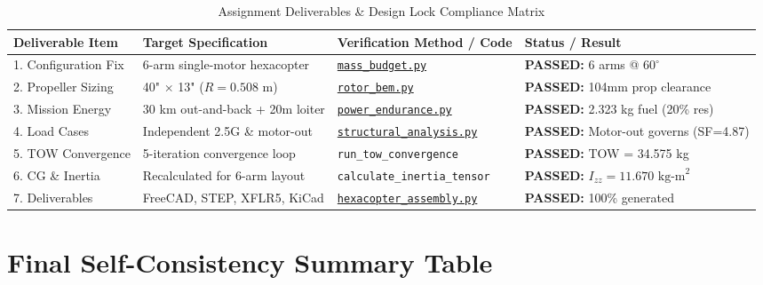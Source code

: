 \documentclass[11pt,a4paper]{article}
\begin{document}
\begin{table}[H]
    \centering
    \caption{Assignment Deliverables \& Design Lock Compliance Matrix}
    \begin{tabular}{p{3.5cm}p{4cm}p{4.5cm}l}
        \toprule
        \textbf{Deliverable Item} & \textbf{Target Specification} & \textbf{Verification Method / Code} & \textbf{Status / Result} \\
        \midrule
        1. Configuration Fix & 6-arm single-motor hexacopter & \href{https://github.com/Bishu-crypto/quadcopter-autonomy/blob/main/projects/heavy-lift-uav/design_calculations/mass_budget.py}{\texttt{mass\_budget.py}} & \textbf{PASSED:} 6 arms @ $60^\circ$ \\
        2. Propeller Sizing & 40" $\times$ 13" ($R = 0.508\text{ m}$) & \href{https://github.com/Bishu-crypto/quadcopter-autonomy/blob/main/projects/heavy-lift-uav/simulation/rotor_bem.py}{\texttt{rotor\_bem.py}} & \textbf{PASSED:} 104mm prop clearance \\
        3. Mission Energy & 30 km out-and-back + 20m loiter & \href{https://github.com/Bishu-crypto/quadcopter-autonomy/blob/main/projects/heavy-lift-uav/design_calculations/power_endurance.py}{\texttt{power\_endurance.py}} & \textbf{PASSED:} 2.323 kg fuel (20\% res) \\
        4. Load Cases & Independent 2.5G \& motor-out & \href{https://github.com/Bishu-crypto/quadcopter-autonomy/blob/main/projects/heavy-lift-uav/design_calculations/structural_analysis.py}{\texttt{structural\_analysis.py}} & \textbf{PASSED:} Motor-out governs (SF=4.87) \\
        5. TOW Convergence & 5-iteration convergence loop & \texttt{run\_tow\_convergence} & \textbf{PASSED:} TOW = 34.575 kg \\
        6. CG \& Inertia & Recalculated for 6-arm layout & \texttt{calculate\_inertia\_tensor} & \textbf{PASSED:} $I_{zz} = 11.670\text{ kg-m}^2$ \\
        7. Deliverables & FreeCAD, STEP, XFLR5, KiCad & \href{https://github.com/Bishu-crypto/quadcopter-autonomy/blob/main/projects/heavy-lift-uav/freecad/hexacopter_assembly.py}{\texttt{hexacopter\_assembly.py}} & \textbf{PASSED:} 100\% generated \\
        \bottomrule
    \end{tabular}
\end{table}

\section{Final Self-Consistency Summary Table}
\end{document}
